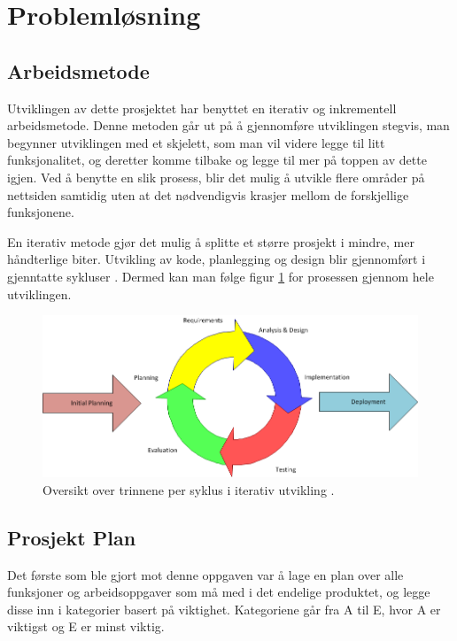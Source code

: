 \section{Problemløsning}
\subsection{Arbeidsmetode}
Utviklingen av dette prosjektet har benyttet en iterativ og inkrementell arbeidsmetode. Denne metoden går ut på å gjennomføre utviklingen stegvis, man begynner utviklingen med et skjelett, som man vil videre legge til litt funksjonalitet, og deretter komme tilbake og legge til mer på toppen av dette igjen. Ved å benytte en slik prosess, blir det mulig å utvikle flere områder på nettsiden samtidig uten at det nødvendigvis krasjer mellom de forskjellige funksjonene.

En iterativ metode gjør det mulig å splitte et større prosjekt i mindre, mer håndterlige biter. Utvikling av kode, planlegging og design blir gjennomført i gjenntatte sykluser \cite{method:iterative_fig}. Dermed kan man følge figur \ref{fig:iterative_development} for prosessen gjennom hele utviklingen.

 \begin{figure}[htbp]
	\centering
		\includegraphics[scale=0.5]{Bilder/iterativ_utvikling.png}
	\caption[Iterativ Utviklings Diagram]{Oversikt over trinnene per syklus i iterativ utvikling \cite{iterative:development}. } %
	\label{fig:iterative_development}
\end{figure}


\subsection{Prosjekt Plan}
Det første som ble gjort mot denne oppgaven var å lage en plan over alle funksjoner og arbeidsoppgaver som må med i det endelige produktet, og legge disse inn i kategorier basert på viktighet. Kategoriene går fra A til E, hvor A er viktigst og E er minst viktig.
